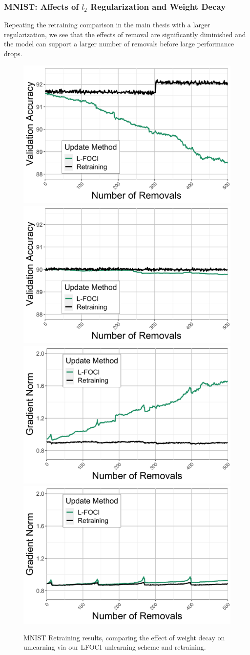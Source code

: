 \subsubsection{MNIST: Affects of $l_2$ Regularization and Weight Decay}
Repeating the retraining comparison in the main thesis with a larger regularization, we see that the effects of removal are significantly diminished and the model can support a larger number of removals before large performance drops.
\begin{figure}
    \centering
    \includegraphics[width=0.24\columnwidth]{5_unlearn/figs/retrain/Retrain_Validation_Accs_0.01.png}
    \includegraphics[width=0.24\columnwidth]{5_unlearn/figs/retrain/Retrain_Validation_Accs_0.1.png}
    \includegraphics[width=0.24\columnwidth]{5_unlearn/figs/retrain/Retrain_Gradient_Norms_0.01.png}
    \includegraphics[width=0.24\columnwidth]{5_unlearn/figs/retrain/Retrain_Gradient_Norms_0.1.png}
    \caption[MNIST Retraining results]{MNIST Retraining results, comparing the effect of weight decay on unlearning via our LFOCI unlearning scheme and retraining.}
    \label{fig:mnistretrainweightdecay}
\end{figure}

